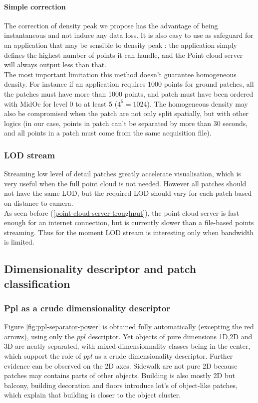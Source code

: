 			 \paragraph{Simple correction}
				 The correction of density peak we propose has the advantage of being instantaneous and not induce any data loss.
				 It is also easy to use as safeguard for an application that may be sensible to density peak : the application simply defines the highest number of points \per \cubic \meter it can handle, and the Point cloud server will always output less than that.
				 \\
				 The most important limitation this method doesn't guarantee homogeneous density.
				 For instance if an application requires 1000 points \per \cubic \meter for ground patches, all the patches must have more than 1000 points, and patch must have been ordered with MidOc for level 0 to at least 5 ($4^5=1024$). 
				 The homogeneous density may also be compromised when the patch are not only split spatially, but with other logics (in our case, points in patch can't be separated by more than 30 seconds, and all points in a patch must come from the same acquisition file).
				 
		 \subsubsection{LOD stream}
			 Streaming low level of detail patches greatly accelerate visualisation,
			 which is very useful when the full point cloud is not needed.
			 However all patches should not have the same LOD,
			 but the required LOD should vary for each patch based on distance to camera.
			 \\
			 As seen before (\ref{point-cloud-server-troughput}), the point cloud server is fast enough for an internet connection, but is currently slower than a file-based points streaming. Thus for the moment LOD stream is interesting only when bandwidth is limited.  
			 
	 \subsection{Dimensionality descriptor and patch classification}
		 \subsubsection{Ppl as a crude dimensionality descriptor }
			 Figure \ref{fig:ppl-separator-power} is obtained fully automatically (excepting the red arrows), using only the $ppl$ descriptor. Yet objects of pure dimensions 1D,2D and 3D are neatly separated, with mixed dimensionnality classes being in the center, which support the role of $ppl$ as a crude dimensionality descriptor.
			 Further evidence can be observed on the 2D axes. Sidewalk are not pure 2D because patches may contains parts of other objects. Building is also mostly 2D but balcony, building decoration and floors introduce lot's of object-like patches, which explain that building is closer to the object cluster.
			 
